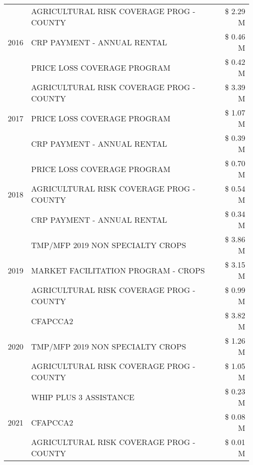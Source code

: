 \begin{tabular}{llr}
\cline{1-3}
\multirow[t]{3}{*}{2016} & AGRICULTURAL RISK COVERAGE PROG - COUNTY & \$ 2.29 M \\
 & CRP PAYMENT - ANNUAL RENTAL & \$ 0.46 M \\
 & PRICE LOSS COVERAGE PROGRAM & \$ 0.42 M \\
\cline{1-3}
\multirow[t]{3}{*}{2017} & AGRICULTURAL RISK COVERAGE PROG - COUNTY & \$ 3.39 M \\
 & PRICE LOSS COVERAGE PROGRAM & \$ 1.07 M \\
 & CRP PAYMENT - ANNUAL RENTAL & \$ 0.39 M \\
\cline{1-3}
\multirow[t]{3}{*}{2018} & PRICE LOSS COVERAGE PROGRAM & \$ 0.70 M \\
 & AGRICULTURAL RISK COVERAGE PROG - COUNTY & \$ 0.54 M \\
 & CRP PAYMENT - ANNUAL RENTAL & \$ 0.34 M \\
\cline{1-3}
\multirow[t]{3}{*}{2019} & TMP/MFP 2019 NON SPECIALTY CROPS & \$ 3.86 M \\
 & MARKET FACILITATION PROGRAM - CROPS & \$ 3.15 M \\
 & AGRICULTURAL RISK COVERAGE PROG - COUNTY & \$ 0.99 M \\
\cline{1-3}
\multirow[t]{3}{*}{2020} & CFAPCCA2 & \$ 3.82 M \\
 & TMP/MFP 2019 NON SPECIALTY CROPS & \$ 1.26 M \\
 & AGRICULTURAL RISK COVERAGE PROG - COUNTY & \$ 1.05 M \\
\cline{1-3}
\multirow[t]{3}{*}{2021} & WHIP PLUS 3 ASSISTANCE & \$ 0.23 M \\
 & CFAPCCA2 & \$ 0.08 M \\
 & AGRICULTURAL RISK COVERAGE PROG - COUNTY & \$ 0.01 M \\
\cline{1-3}
\bottomrule
\end{tabular}
